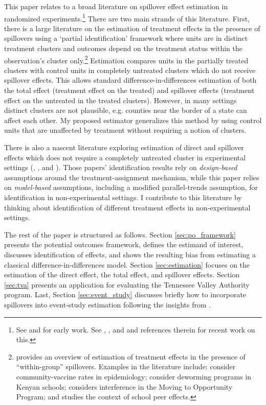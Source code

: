 \documentclass[11pt]{article}
\begin{document}
This paper relates to a broad literature on spillover effect estimation in randomized experiments.\footnote{See \citet{Sobel_2006} and \citet{Hudgens_Halloran_2008} for early work. See \citet{Hu_Li_Wager_2021}, \citet{Savje_Aronow_Hudgens_2021}, and \citet{Vazquez-Bare_2019} and references therein for recent work on this.} There are two main strands of this literature. First, there is a large literature on the estimation of treatment effects in the presence of spillovers using a `partial identification' framework where units are in distinct treatment clusters and outcomes depend on the treatment status within the observation's cluster only.\footnote{ \citet{Angelucci_DiMaro_2016} provides an overview of estimation of treatment effects in the presence of ``within-group'' spillovers. Examples in the literature include: \citet{Halloran_Struchiner_1995} consider community-vaccine rates in epidemiology; \citet{Miguel_Kremer_2004} consider deworming programs in Kenyan schools; \citet{Sobel_2006} considers interference in the Moving to Opportunity Program; and \citet{Angrist_2014} studies the context of school peer effects.} Estimation compares units in the partially treated clusters with control units in completely untreated clusters which do not receive spillover effects. This allows standard difference-in-differences estimation of both the total effect (treatment effect on the treated) and spillover effects (treatment effect on the untreated in the treated clusters). However, in many settings distinct clusters are not plausible, e.g. counties near the border of a state can affect each other. My proposed estimator generalizes this method by using control units that are unaffected by treatment without requiring a notion of clusters.

There is also a nascent literature exploring estimation of direct and spillover effects which does not require a completely untreated cluster in experimental settings (\citet{Savje_Aronow_Hudgens_2021}, \citet{Vazquez-Bare_2019}, and \citet{Hu_Li_Wager_2021}). Those papers' identification results rely on \emph{design-based} assumptions around the treatment-assignment mechanism, while this paper relies on \emph{model-based} assumptions, including a modified parallel-trends assumption, for identification in non-experimental settings. I contribute to this literature by thinking about identification of different treatment effects in non-experimental settings. 

The rest of the paper is structured as follows. Section \ref{sec:po_framework} presents the potential outcomes framework, defines the estimand of interest, discusses identification of effects, and shows the resulting bias from estimating a classical difference-in-differences model. Section \ref{sec:estimation} focuses on the estimation of the direct effect, the total effect, and spillover effects. Section \ref{sec:tva} presents an application for evaluating the Tennessee Valley Authority program. Last, Section \ref{sec:event_study} discusses briefly how to incorporate spillovers into event-study estimation following the insights from \citet{Gardner_2021}. 
\end{document}
